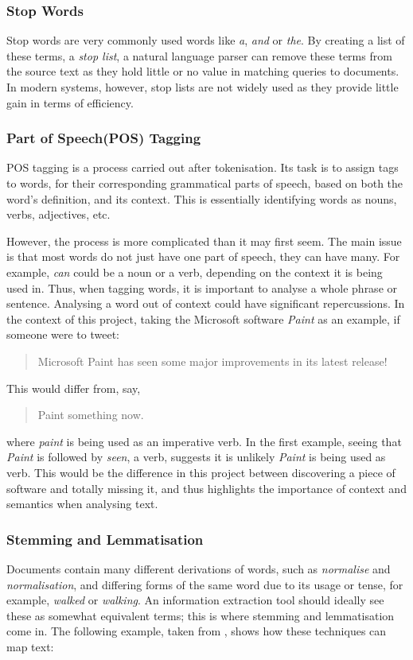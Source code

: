 \subsubsection{Stop Words}
Stop words are very commonly used words like \emph{a}, \emph{and} or \emph{the}. By creating a list of these terms, a \emph{stop list}, a natural language parser can remove these terms from the source text as they hold little or no value in matching queries to documents. In modern systems, however, stop lists are not widely used as they provide little gain in terms of efficiency\cite{manning2008}.

\subsubsection{Part of Speech(POS) Tagging}
POS tagging is a process carried out after tokenisation. Its task is to assign tags to words, for their corresponding grammatical parts of speech, based on both the word's definition, and its context. This is essentially identifying words as nouns, verbs, adjectives, etc.

However, the process is more complicated than it may first seem. The main issue is that most words do not just have one part of speech, they can have many. For example, \emph{can} could be a noun or a verb, depending on the context it is being used in. Thus, when tagging words, it is important to analyse a whole phrase or sentence. Analysing a word out of context could have significant repercussions. In the context of this project, taking the Microsoft software \emph{Paint} as an example, if someone were to tweet:
\begin{quote}
Microsoft Paint has seen some major improvements in its latest release!
\end{quote}
This would differ from, say,
\begin{quote}
Paint something now.
\end{quote}
where \emph{paint} is being used as an imperative verb. In the first example, seeing that \emph{Paint} is followed by \emph{seen}, a verb, suggests it is unlikely \emph{Paint} is being used as verb.  This would be the difference in this project between discovering a piece of software and totally missing it, and thus highlights the importance of context and semantics when analysing text.


\subsubsection{Stemming and Lemmatisation}
Documents contain many different derivations of words, such as \emph{normalise} and \emph{normalisation}, and differing forms of the same word due to its usage or tense, for example, \emph{walked} or \emph{walking}. An information extraction tool should ideally see these as somewhat equivalent terms; this is where stemming and lemmatisation come in. The following example, taken from \cite{manning2008}, shows how these techniques can map text:

